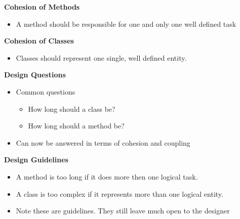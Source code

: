 \documentclass{beamer}
\begin{document}
\begin{frame}
\begin{center}
\textbf{Cohesion of Methods}
\end{center}
\begin{itemize}
\item A method should be responsible for one and only one well defined task
\end{itemize}
\end{frame}

\begin{frame}
\begin{center}
\textbf{Cohesion of Classes}
\end{center}
\begin{itemize}
\item Classes should represent one single, well defined entity.
\end{itemize}
\end{frame}

\begin{frame}
\begin{center}
\textbf{Design Questions}
\end{center}
\begin{itemize}
\item Common questions
\begin{itemize}
\item How long should a class be?
\item How long should a method be?
\end{itemize}
\item Can now be answered in terms of cohesion and coupling
\end{itemize}
\end{frame}

\begin{frame}
\begin{center}
\textbf{Design Guidelines}
\end{center}
\begin{itemize}
\item A method is too long if it does more then one logical task.
\item A class is too complex if it represents more than one logical entity.
\item Note these are guidelines. They still leave much open to the designer
\end{itemize}
\end{frame}
\end{document}

